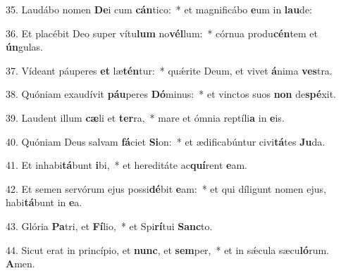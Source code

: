 35. Laudábo nomen \textbf{De}i cum \textbf{cán}tico:~*  et magnificábo \textbf{e}um in \textbf{lau}de:\

36. Et placébit Deo super vítu\textbf{lum} no\textbf{vél}lum:~*  córnua produ\textbf{cén}tem et \textbf{ún}gulas.\

37. Vídeant páuperes \textbf{et} læ\textbf{tén}tur:~*  quǽrite Deum, et vivet \textbf{á}nima \textbf{ves}tra.\

38. Quóniam exaudívit \textbf{páu}peres \textbf{Dó}minus:~*  et vinctos suos \textbf{non} de\textbf{spé}xit.\

39. Laudent illum \textbf{cæ}li et \textbf{ter}ra,~*  mare et ómnia reptíli\textbf{a} in \textbf{e}is.\

40. Quóniam Deus salvam \textbf{fá}ciet \textbf{Si}on:~*  et ædificabúntur civi\textbf{tá}tes \textbf{Ju}da.\

41. Et inhabi\textbf{tá}bunt \textbf{i}bi,~*  et hereditáte ac\textbf{quí}rent \textbf{e}am.\

42. Et semen servórum ejus possi\textbf{dé}bit \textbf{e}am:~*  et qui díligunt nomen ejus, habi\textbf{tá}bunt in \textbf{e}a.\

43. Glória \textbf{Pa}tri, et \textbf{Fí}lio,~*  et Spi\textbf{rí}tui \textbf{Sanc}to.\

44. Sicut erat in princípio, et \textbf{nunc}, et \textbf{sem}per,~*  et in sǽcula sæcu\textbf{ló}rum. \textbf{A}men.\

